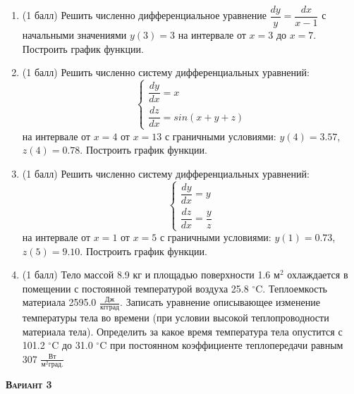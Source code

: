 \begin{enumerate}
\item (1 балл) Решить численно дифференциальное уравнение $\dfrac{dy}{y}=\dfrac{dx}{x-1}         $ с начальными значениями $y(     3)=     3$ на интервале от $x=     3$ до $x=     7$. Построить график функции.\item (1 балл) Решить численно систему дифференциальных уравнений:
 \begin{equation*}
\left\{
\begin{gathered}
\dfrac{dy}{dx}=x                     \\
\dfrac{dz}{dx}=sin(x+y+z)            
\end{gathered}
\right.
\end{equation*}
на интервале от $x= 4$ от $x=13$ с граничными условиями: $y( 4)=3.57$, $z( 4)=0.78$. Построить график функции. 
\item (1 балл) Решить численно систему дифференциальных уравнений:
 \begin{equation*}
\left\{
\begin{gathered}
\dfrac{dy}{dx}=y\\
\dfrac{dz}{dx}=\dfrac{y}{z}
\end{gathered}
\right.
\end{equation*}
на интервале от $x= 1$ от $x= 5$ с граничными условиями: $y( 1)=0.73$, $z( 5)=9.10$.  Построить график функции. 
\item (1 балл)  Тело массой 8.9 кг и площадью поверхности 1.6 м$^2$ охлаждается в помещении с постоянной температурой воздуха 25.8 $^\circ\mathrm{C}$. Теплоемкость материала 2595.0 $\frac{Дж}{кг град}$. Записать уравнение описывающее изменение температуры тела во времени (при условии высокой теплопроводности материала тела). Определить за какое время температура тела опустится с 101.2 $^\circ\mathrm{C}$ до 31.0 $^\circ\mathrm{C}$ при постоянном коэффициенте теплопередачи равным   307 $\frac{Вт}{м^2 град.}$ 

\end{enumerate}
\textsc{\textbf{Вариант 3}}

